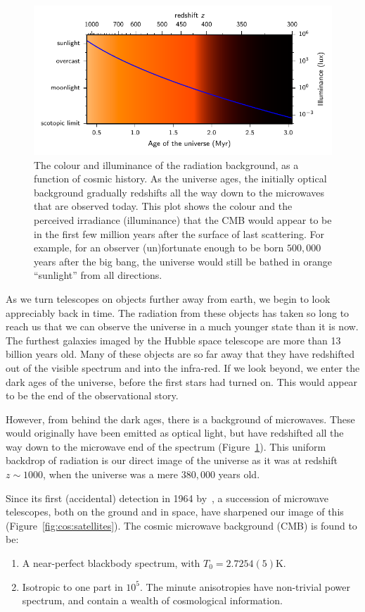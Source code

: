 \begin{figure}[tp]
  \centering
  \includegraphics[width=\textwidth]{chapters/inflationary_cosmology/figures/cmb_colour}
  \caption{The colour and illuminance of the radiation background, as a function of cosmic history. As the universe ages, the initially optical background gradually redshifts all the way down to the microwaves that are observed today. This plot shows the colour and the perceived irradiance (illuminance) that the CMB would appear to be in the first few million years after the surface of last scattering. For example, for an observer (un)fortunate enough to be born $500,000$ years after the big bang, the universe would still be bathed in orange ``sunlight'' from all directions.}\label{fig:cos:cmb_colour}
\end{figure}

As we turn telescopes on objects further away from earth, we begin to look appreciably back in time. The radiation from these objects has taken so long to reach us that we can observe the universe in a much younger state than it is now. The furthest galaxies imaged by the Hubble space telescope are more than 13 billion years old. Many of these objects are so far away that they have redshifted out of the visible spectrum and into the infra-red. If we look beyond, we enter the dark ages of the universe, before the first stars had turned on. This would appear to be the end of the observational story.

However, from behind the dark ages, there is a background of microwaves. These would originally have been emitted as optical light, but have redshifted all the way down to the microwave end of the spectrum (Figure~\ref{fig:cos:cmb_colour}). This uniform backdrop of radiation is our direct image of the universe as it was at redshift $z\sim1000$, when the universe was a mere $380,000$ years old.

Since its first (accidental) detection in 1964 by~\cite{PenziasWilson}, a succession of microwave telescopes, both on the ground and in space, have sharpened our image of this (Figure~\ref{fig:cos:satellites}).
The cosmic microwave background (CMB) is found to be:
\begin{enumerate}
  \item A near-perfect blackbody spectrum, with $T_0=2.7254(5)$K.
  \item Isotropic to one part in $10^{5}$. The minute anisotropies have non-trivial power spectrum, and contain a wealth of cosmological information.
\end{enumerate}

